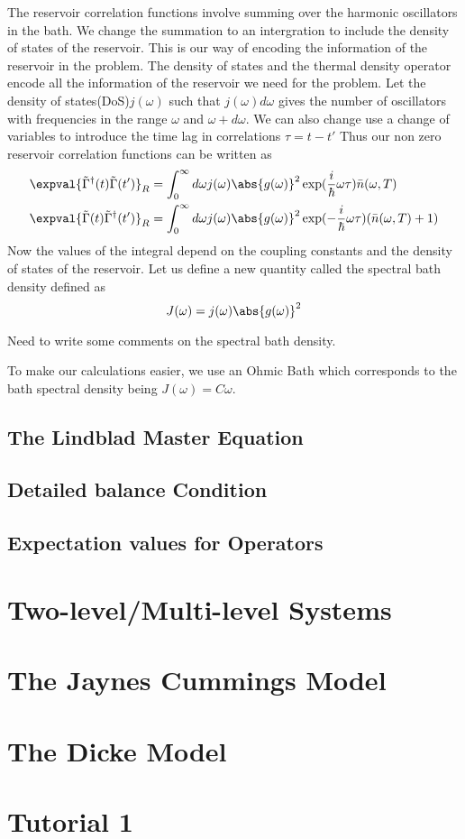 \documentclass{scrartcl}
\newcommand{\1}{\mathbbm{1}}
\newcommand{\iG}{\tilde{\Gamma}}
\newcommand{\nbar}{\bar{n}}
\begin{document}
The reservoir correlation functions involve summing over the harmonic oscillators in the bath. We change the summation
to an intergration to include the density of states of the reservoir. This is our way of encoding the
information of the reservoir in the problem. The density of states and the thermal density operator encode
all the information of the reservoir we need for the problem. Let the density of states(DoS)\(j(\omega)\) such that
\(j(\omega) d\omega\) gives the number of oscillators with frequencies in the range \(\omega\) and \(\omega + d\omega\). We can also
change use a change of variables to introduce the time lag in correlations \(\tau = t-t'\)
Thus our non zero reservoir correlation functions can be written as
\begin{align}
	\expval{\iG^\dagger(t)\iG(t')}_R & = \int_0^\infty d\omega j(\omega) \abs{g(\omega)}^2 \exp(\frac{i}{\hbar} \omega \tau) \nbar(\omega,T) \label{eq: rescorr1}\\
	\expval{\iG(t)\iG^\dagger(t')}_R & = \int_0^\infty d\omega j(\omega) \abs{g(\omega)}^2 \exp(-\frac{i}{\hbar} \omega \tau) (\nbar(\omega,T)+1)
\end{align}
Now the values of the integral depend on the coupling constants and the density of states of the reservoir. Let us define a new quantity called the spectral bath density
defined as 
\begin{equation}
	J(\omega) = j(\omega) \abs{g(\omega)}^2	
\end{equation}

\begin{remark}
	Need to write some comments on the spectral bath density.
\end{remark}
To make our calculations easier, we use an Ohmic Bath which corresponds to the bath spectral density being 
\(J(\omega) = C \omega\). 

\subsection{The Lindblad Master Equation}
\subsection{Detailed balance Condition}
\subsection{Expectation values for Operators}
\section{Two-level/Multi-level Systems}
\section{The Jaynes Cummings Model}
\section{The Dicke Model}
\section{Tutorial 1}
\end{document}
